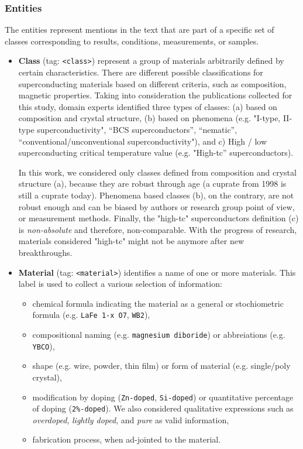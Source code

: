 \documentclass[fleqn,10pt]{wlscirep}
\begin{document}
\subsubsection*{Entities}
The entities represent mentions in the text that are part of a specific set of classes corresponding to results, conditions, measurements, or samples.

\begin{itemize}
\item \textbf{Class} (tag: \texttt{<class>}) represent a group of materials arbitrarily defined by certain characteristics.
There are different possible classifications for superconducting materials based on different criteria, such as composition, magnetic properties. Taking into consideration the publications collected for this study, domain experts identified three types of classes: (a) based on composition and crystal structure, (b) based on phenomena (e.g. "I-type, II-type superconductivity", “BCS superconductors”, “nematic”, “conventional/unconventional superconductivity"), and c) High / low superconducting critical temperature value (e.g. "High-tc” superconductors). 

In this work, we considered only classes defined from composition and crystal structure (a), because they are robust through age (a cuprate from 1998 is still a cuprate today). 
Phenomena based classes (b), on the contrary, are not robust enough and can be biased by authors or research group point of view, or measurement methods. 
Finally, the "high-tc" superconductors definition (c) is \textit{non-absolute} and therefore, non-comparable. With the progress of research, materials considered "high-tc" might not be anymore after new breakthroughs.

\item  \textbf{Material} (tag: \texttt{<material>}) identifies a name of one or more materials. 
This label is used to collect a various selection of information: 
\begin{itemize}
    \item chemical formula indicating the material as a general or stochiometric formula (e.g. \texttt{LaFe 1-x O7}, \texttt{WB2}),
    \item compositional naming (e.g. \texttt{magnesium diboride}) or abbreiations (e.g. \texttt{YBCO}), 
    \item shape (e.g. wire, powder, thin film) or form of material (e.g. single/poly crystal), 
    \item modification by doping (\texttt{Zn-doped}, \texttt{Si-doped}) or quantitative percentage of doping (\texttt{2\%-doped}). We also considered qualitative expressions such as \textit{overdoped}, \textit{lightly doped}, and \textit{pure} as valid information, 
    \item fabrication process, when ad-jointed to the material. 
\end{itemize}


\end{itemize}
\end{document}
